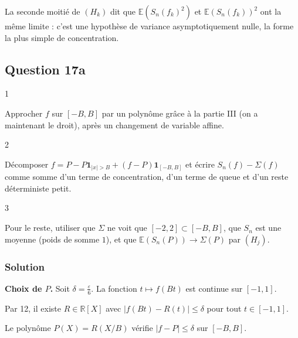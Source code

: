 \documentclass[11pt,a4paper]{article}
\begin{document}
\begin{methode}

La seconde moitié de \((H_k)\) dit que \(\mathbb E(S_n(f_k)^2)\) et \(\mathbb E(S_n(f_k))^2\) ont la même limite : c'est une hypothèse de variance asymptotiquement nulle, la forme la plus simple de concentration.

\end{methode}

\hypertarget{question-17a}{%
\subsection{Question 17a}\label{question-17a}}

\begin{indication}{1}

Approcher \(f\) sur \([-B,B]\) par un polynôme grâce à la partie III (on a maintenant le droit), après un changement de variable affine.

\end{indication}

\begin{indication}{2}

Décomposer \(f=P-P\mathbf 1_{|x|>B}+(f-P)\mathbf 1_{[-B,B]}\) et écrire \(S_n(f)-\Sigma(f)\) comme somme d'un terme de concentration, d'un terme de queue et d'un reste déterministe petit.

\end{indication}

\begin{indication}{3}

Pour le reste, utiliser que \(\Sigma\) ne voit que \([-2,2]\subset[-B,B]\), que \(S_n\) est une moyenne (poids de somme \(1\)), et que \(\mathbb E(S_n(P))\to\Sigma(P)\) par \((H_j)\).

\end{indication}

\hypertarget{solution-28}{%
\subsubsection{Solution}\label{solution-28}}

\textbf{Choix de \(P\).} Soit \(\delta=\frac\varepsilon6\). La fonction \(t\mapsto f(Bt)\) est continue sur \([-1,1]\).

Par 12, il existe \(R\in\mathbb R[X]\) avec \(|f(Bt)-R(t)|\le\delta\) pour tout \(t\in[-1,1]\).

Le polynôme \(P(X)=R(X/B)\) vérifie \(|f-P|\le\delta\) sur \([-B,B]\).
\end{document}
